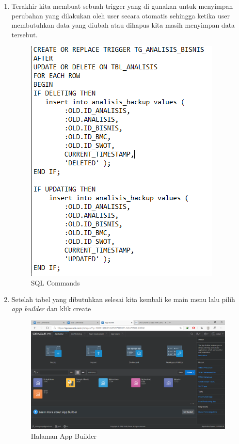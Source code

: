\begin{enumerate}
\item Terakhir kita membuat sebuah trigger yang di gunakan untuk menyimpan perubahan yang dilakukan oleh user secara otomatis sehingga ketika user membutuhkan data yang diubah atau dihapus kita masih menyimpan data tersebut. 
\begin{figure}[H]
\centering
\caption{SQL Commands}
\includegraphics[witdh=1\textwidth]{figures/30.png}
\end{figure}


\item Setelah tabel yang dibutuhkan selesai kita kembali ke main menu lalu pilih \textit{app builder} dan klik create  
\begin{figure}[H]
\centering
\caption{Halaman App Builder}
\includegraphics[width=1\textwidth]{figures/1.png}
\end{figure}


\end{enumerate}
